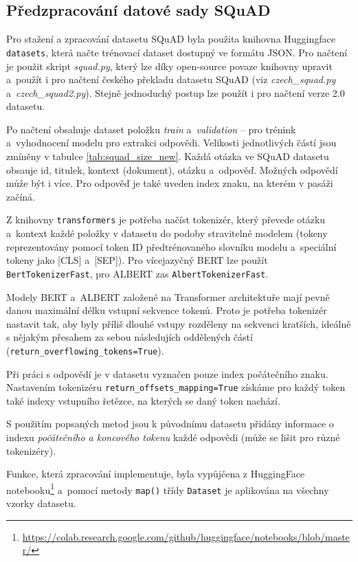 \subsection{Předzpracování datové sady SQuAD}
Pro stažení a zpracování datasetu SQuAD byla použita knihovna Huggingface \texttt{ datasets}, která načte trénovací dataset dostupný ve formátu JSON. Pro načtení je použit skript \emph{squad.py}, který lze díky open-source povaze knihovny upravit a~použít i pro načtení českého překladu datasetu SQuAD \cite{cz_suqad_download} (viz \emph{czech\_squad.py} a~\emph{czech\_squad2.py}). Stejně jednoduchý postup lze použít i pro načtení verze 2.0 datasetu.\par
Po načtení obsahuje dataset položku \emph{train} a~\emph{validation} -- pro trénink a~vyhodnocení modelu pro extrakci odpovědi. Velikosti jednotlivých částí jsou zmíněny v tabulce \ref{tab:squad_size_new}. Každá otázka ve SQuAD datasetu obsauje id, titulek, kontext (dokument), otázku a~odpověď. Možných odpovědí může být i více. Pro odpověď je také uveden index znaku, na kterém v pasáži začíná.\par
Z knihovny \texttt{transformers} je potřeba načíst tokenizér, který převede otázku a~kontext každé položky v datasetu do podoby stravitelné modelem (tokeny reprezentovány pomocí token ID předtrénovaného slovníku modelu a~speciální tokeny jako [CLS] a~[SEP]). Pro více\-jazyčný BERT lze použít \texttt{BertTokenizerFast}, pro ALBERT zas \texttt{AlbertTokenizerFast}.\par
\pagebreak
Modely BERT a~ALBERT založené na Transformer architektuře mají pevně danou maximální délku vstupní sekvence tokenů. Proto je potřeba tokenizér nastavit tak, aby byly příliš dlouhé vstupy rozděleny na sekvenci kratších, ideálně s nějakým přesahem za sebou následujích oddělených částí (\texttt{return\_overflowing\_tokens=True}).\par
Při práci s odpovědí je v datasetu vyznačen pouze index počátečního znaku. Nastavením tokenizéru \texttt{return\_offsets\_mapping=True} získáme pro každý token také indexy vstupního řetězce, na kterých se daný token nachází.\par
S použitím popsaných metod jsou k původnímu datasetu přidány informace o indexu \emph{počátečního a koncového tokenu} každé odpovědi (může se lišit pro různé tokenizéry).\par 
Funkce, která zpracování implementuje, byla vypůjčena z HuggingFace notebooku\footnote{\url{https://colab.research.google.com/github/huggingface/notebooks/blob/master/}} a~pomocí metody \texttt{map()} třídy \texttt{Dataset} je aplikována na všechny vzorky datasetu.

